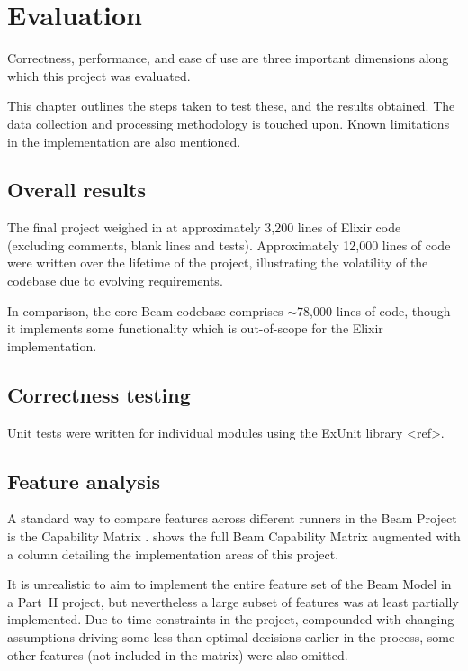 \chapter{Evaluation}\label{ch:eval}


Correctness, performance, and ease of use are three important dimensions along which this project was evaluated.

This chapter outlines the steps taken to test these, and the results obtained.
The data collection and processing methodology is touched upon.
Known limitations in the implementation are also mentioned.


\section{Overall results}\label{sec:eval:overall}

The final project weighed in at approximately 3,200 lines of Elixir code (excluding comments, blank lines and tests).
Approximately 12,000 lines of code were written over the lifetime of the project, illustrating the volatility of the codebase due to evolving requirements.

In comparison, the core Beam codebase comprises $\sim$78,000 lines of code, though it implements some functionality which is out-of-scope for the Elixir implementation.

\section{Correctness testing}\label{sec:eval:correctness}

Unit tests were written for individual modules using the ExUnit library <ref>.

\section{Feature analysis}\label{sec:eval:limitations}

A standard way to compare features across different runners in the Beam Project is the Capability Matrix \cite{Beam-Cap-Matrix}.
 shows the full Beam Capability Matrix augmented with a column detailing the implementation areas of this project.


It is unrealistic to aim to implement the entire feature set of the Beam Model in a Part~II project, but nevertheless a large subset of features was at least partially implemented.
Due to time constraints in the project, compounded with changing assumptions driving some less-than-optimal decisions earlier in the process, some other features (not included in the matrix) were also omitted.

